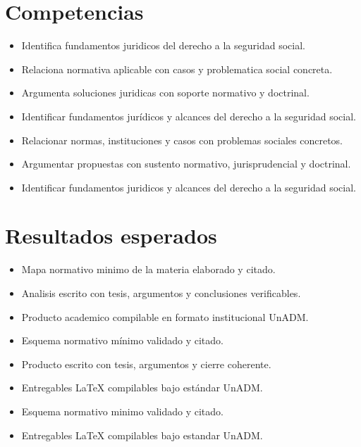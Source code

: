 \documentclass[12pt]{article}
\begin{document}
\section*{Competencias}
\begin{itemize}[leftmargin=*]
  \item Identifica fundamentos juridicos del derecho a la seguridad social.
  \item Relaciona normativa aplicable con casos y problematica social concreta.
  \item Argumenta soluciones juridicas con soporte normativo y doctrinal.
  \item Identificar fundamentos jurídicos y alcances del derecho a la seguridad social.
  \item Relacionar normas, instituciones y casos con problemas sociales concretos.
  \item Argumentar propuestas con sustento normativo, jurisprudencial y doctrinal.
  \item Identificar fundamentos juridicos y alcances del derecho a la seguridad social.
\end{itemize}

\section*{Resultados esperados}
\begin{itemize}[leftmargin=*]
  \item Mapa normativo minimo de la materia elaborado y citado.
  \item Analisis escrito con tesis, argumentos y conclusiones verificables.
  \item Producto academico compilable en formato institucional UnADM.
  \item Esquema normativo mínimo validado y citado.
  \item Producto escrito con tesis, argumentos y cierre coherente.
  \item Entregables LaTeX compilables bajo estándar UnADM.
  \item Esquema normativo minimo validado y citado.
  \item Entregables LaTeX compilables bajo estandar UnADM.
\end{itemize}
\end{document}
